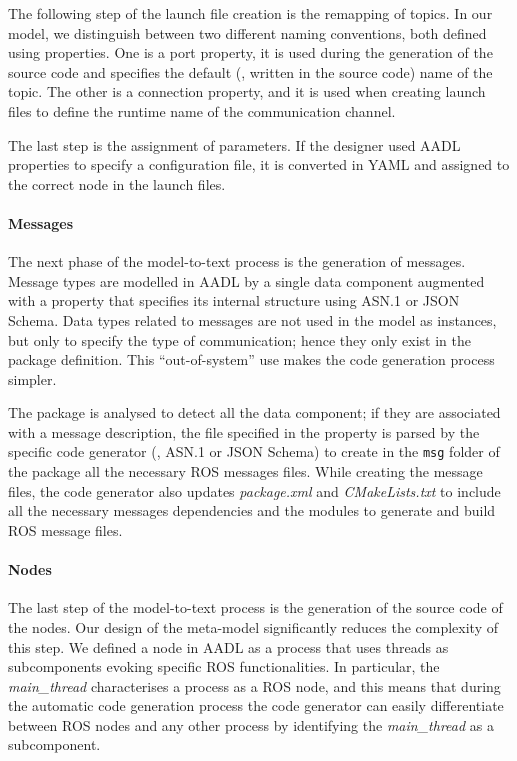 The following step of the launch file creation is the remapping of topics. In our model, we distinguish between two different naming conventions, both defined using properties. One is a port property, it is used during the generation of the source code and specifies the default (\ie, written in the source code) name of the topic. The other is a connection property, and it is used when creating launch files to define the runtime name of the communication channel.

The last step is the assignment of parameters. If the designer used AADL properties to specify a configuration file, it is converted in YAML and assigned to the correct node in the launch files.
  
\paragraph{Messages} The next phase of the model-to-text process is the generation of messages. Message types are modelled in AADL by a single data component augmented with a property that specifies its internal structure using ASN.1 or JSON Schema. Data types related to messages are not used in the model as instances, but only to specify the type of communication; hence they only exist in the package definition. This ``out-of-system'' use makes the code generation process simpler.

The package is analysed to detect all the data component; if they are associated with a message description, the file specified in the property is parsed by the specific code generator (\ie, ASN.1 or JSON Schema) to create in the \texttt{msg} folder of the package all the necessary ROS messages files. While creating the message files, the code generator also updates \textit{package.xml} and \textit{CMakeLists.txt} to include all the necessary messages dependencies and the modules to generate and build ROS message files.

\paragraph{Nodes} The last step of the model-to-text process is the generation of the source code of the nodes. Our design of the meta-model significantly reduces the complexity of this step. We defined a node in AADL as a process that uses threads as subcomponents evoking specific ROS functionalities. In particular, the \textit{main\_thread} characterises a process as a ROS node, and this means that during the automatic code generation process the code generator can easily differentiate between ROS nodes and any other process by identifying the \textit{main\_thread} as a subcomponent.

